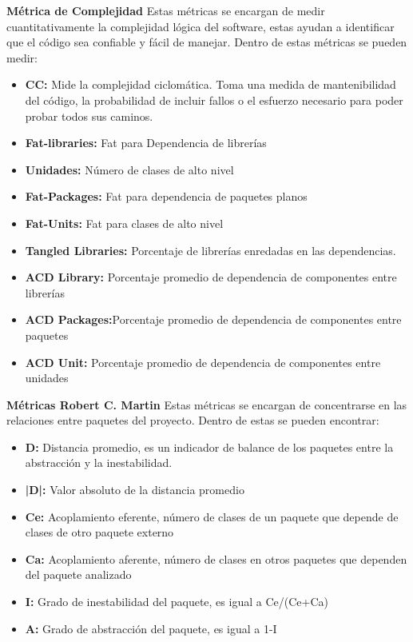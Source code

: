 \textbf{Métrica de Complejidad}
Estas métricas se encargan de medir cuantitativamente la complejidad lógica del software, estas ayudan a identificar que el código sea confiable y fácil de manejar. Dentro de estas métricas se pueden medir:
\begin{itemize}[itemsep=0mm,topsep=0pt,leftmargin=0.6in]
	\item\textbf{CC:} Mide la complejidad ciclomática. Toma una medida de mantenibilidad del código, la probabilidad de incluir fallos o el esfuerzo necesario para poder probar todos sus caminos\cite{ccmetric}.
	\item\textbf{Fat-libraries:} Fat para Dependencia de librerías
	\item\textbf{Unidades:} Número de clases de alto nivel
	\item\textbf{Fat-Packages:} Fat para dependencia de paquetes planos
	\item\textbf{Fat-Units:} Fat para clases de alto nivel
	\item\textbf{Tangled Libraries:} Porcentaje de librerías enredadas en las dependencias.
	\item\textbf{ACD Library:} Porcentaje promedio de dependencia de componentes entre librerías
	\item\textbf{ACD Packages:}Porcentaje promedio de dependencia de componentes entre paquetes
	\item\textbf{ACD Unit:}  Porcentaje promedio de dependencia de componentes entre unidades
\end{itemize}

\textbf{Métricas Robert C. Martin}
Estas métricas se encargan de concentrarse en las relaciones entre paquetes del proyecto. Dentro de estas se pueden encontrar:
\begin{itemize}[itemsep=0mm,topsep=0pt,leftmargin=0.6in]
	\item\textbf{D:} Distancia promedio, es un indicador de balance de los paquetes entre la abstracción y la inestabilidad.
	\item\textbf{|D|:} Valor absoluto de la distancia promedio
	\item\textbf{Ce:} Acoplamiento eferente, número de clases de un paquete que depende de clases de otro paquete externo
	\item\textbf{Ca:} Acoplamiento aferente, número de clases en otros paquetes que dependen del paquete analizado
	\item\textbf{I:} Grado de inestabilidad del paquete, es igual a Ce/(Ce+Ca)
	\item\textbf{A:} Grado de abstracción del paquete, es igual a 1-I
\end{itemize}

